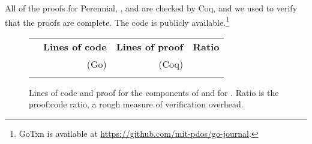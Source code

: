 All of the proofs for Perennial, \txn, and \simplenfs are checked by Coq, and we
used  to verify that the proofs are complete.  The
code is publicly available.\footnote{GoTxn is available at
\url{https://github.com/mit-pdos/go-journal}.}


\begin{figure}
\centering
\small
\begin{tabular}{lrrr}
\toprule
  & \bf Lines of code & \bf Lines of proof & \bf Ratio \\
  & (Go) & (Coq) & \\
\midrule
   \\
\bottomrule
\end{tabular}
\caption{Lines of code and proof for the components of \txn and for
\simplenfs. Ratio is the proof:code ratio, a rough measure of verification overhead.}
\label{fig:loc}
\end{figure}



%
% 
%
%
% 
%
